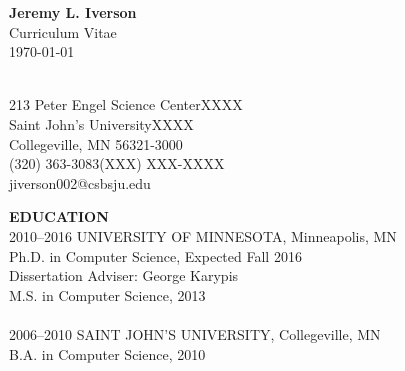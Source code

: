 \documentclass[a4paper,12pt]{article}
\newcommand{\lskip}[1]{\hspace*{1em}\\[#1\baselineskip]}
\begin{document}
\begin{center}
{\large\textbf{Jeremy L. Iverson}}\\
Curriculum Vitae\\
\today
\end{center}
%
\lskip{-3}
%
213 Peter Engel Science Center\hfill XXXX\\
Saint John's University\hfill XXXX\\
Collegeville, MN 56321-3000\hfill\\
(320) 363-3083\hfill (XXX) XXX-XXXX\\
jiverson002@csbsju.edu


\textbf{EDUCATION}
\lskip{1}
%
2010--2016  \tabto{7em}UNIVERSITY OF MINNESOTA, Minneapolis, MN\\
            \tabto{7em}Ph.D. in Computer Science, Expected Fall 2016\\
            \tabto{8em}Dissertation Adviser: George Karypis\\
            \tabto{7em}M.S. in Computer Science, 2013\\
%
\lskip{0}
%
2006--2010  \tabto{7em}SAINT JOHN'S UNIVERSITY, Collegeville, MN\\
            \tabto{7em}B.A. in Computer Science, 2010
\end{document}
